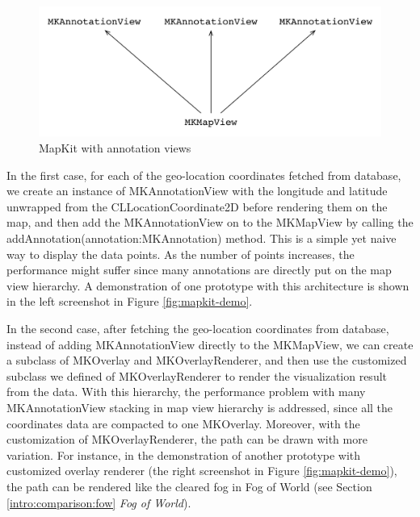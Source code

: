\documentclass[12pt,a4paper]{article}
\renewcommand\texttt[1]{{\ttfamily\color{textttColor}#1}}
\begin{document}
                \begin{figure}
                    \includegraphics[width=.9\textwidth]{4-1-2-1-a}
                    \centering
                    \caption{MapKit with annotation views}
                    \label{fig:mapkit-annotation}
                \end{figure}
                
                In the first case, for each of the geo-location coordinates fetched from database, we create an instance of \texttt{MKAnnotationView} with the longitude and latitude unwrapped from the \texttt{CLLocationCoordinate2D} before rendering them on the map, and then add the \texttt{MKAnnotationView} on to the \texttt{MKMapView} by calling the \texttt{addAnnotation(annotation:MKAnnotation)} method. This is a simple yet naive way to display the data points. As the number of points increases, the performance might suffer since many annotations are directly put on the map view hierarchy. A demonstration of one prototype with this architecture is shown in the left screenshot in Figure \ref{fig:mapkit-demo}.
                
                In the second case, after fetching the geo-location coordinates from database, instead of adding \texttt{MKAnnotationView} directly to the \texttt{MKMapView}, we can create a subclass of \texttt{MKOverlay} and \texttt{MKOverlayRenderer}, and then use the customized subclass we defined of \texttt{MKOverlayRenderer} to render the visualization result from the data. With this hierarchy, the performance problem with many \texttt{MKAnnotationView} stacking in map view hierarchy is addressed, since all the coordinates data are compacted to one \texttt{MKOverlay}. Moreover, with the customization of \texttt{MKOverlayRenderer}, the path can be drawn with more variation. For instance, in the demonstration of another prototype with customized overlay renderer (the right screenshot in Figure \ref{fig:mapkit-demo}), the path can be rendered like the cleared fog in Fog of World (see Section \ref{intro:comparison:fow} \textit{Fog of World}).
                
\end{document}
